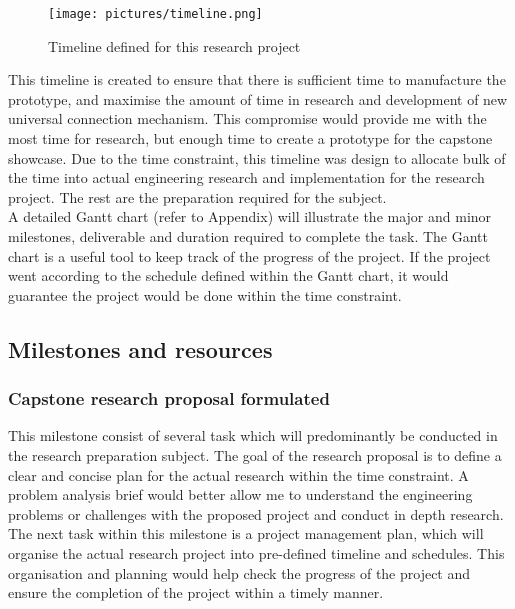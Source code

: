 \documentclass[12pt,A4]{article}
\begin{document}
	\begin{figure}[h!]
		\centering
		\texttt{[image: pictures/timeline.png]}
		\caption{Timeline defined for this research project}
	\end{figure}
	
	This timeline is created to ensure that there is sufficient time to manufacture the prototype, and maximise the amount of time in research and development of new universal connection mechanism. This compromise would provide me with the most time for research, but enough time to create a prototype for the capstone showcase. Due to the time constraint, this timeline was design to allocate bulk of the time into actual engineering research and implementation for the research project. The rest are the preparation required for the subject.\\
	
	A detailed Gantt chart (refer to Appendix) will illustrate the major and minor milestones, deliverable and duration required to complete the task. The Gantt chart is a useful tool to keep track of the progress of the project. If the project went according to the schedule defined within the Gantt chart, it would guarantee the project would be done within the time constraint.\\
	
	\subsection{Milestones and resources}
	\subsubsection{Capstone research proposal formulated}
	
	This milestone consist of several task which will predominantly be conducted in the research preparation subject. The goal of the research proposal is to define a clear and concise plan for the actual research within the time constraint. A problem analysis brief would better allow me to understand the engineering problems or challenges with the proposed project and conduct in depth research.\\

	The next task within this milestone is a project management plan, which will organise the actual research project into pre-defined timeline and schedules. This organisation and planning would help check the progress of the project and ensure the completion of the project within a timely manner.\\
	
\end{document}
